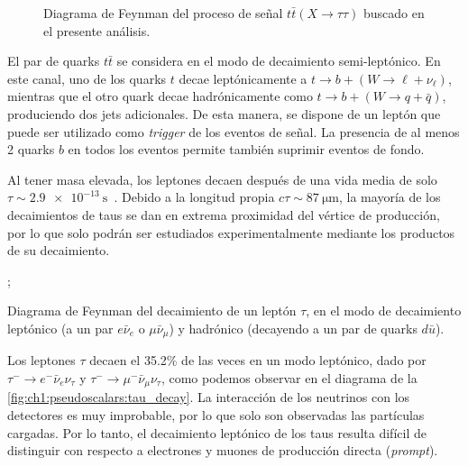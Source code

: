 \begin{figure}[t]
  \centering
  \resizebox{0.7\linewidth}{!}{\ttXdiagram[small]}
  \caption{Diagrama de Feynman del proceso de señal $t\bar{t}(X \to \tau\tau)$ buscado en el presente análisis.}
  \label{fig:ch1:pseudoscalars:ttX:diagram}
\end{figure}

El par de quarks $t\bar{t}$ se considera en el modo de decaimiento semi-leptónico. En este canal, uno de los quarks $t$ decae leptónicamente a $t \to b + (W \to \ell + \nu_\ell)$, mientras que el otro quark decae hadrónicamente como $t \to b + (W \to q + \bar{q})$, produciendo dos jets adicionales. De esta manera, se dispone de un leptón que puede ser utilizado como \textit{trigger} de los eventos de señal. La presencia de al menos 2 quarks $b$ en todos los eventos permite también suprimir eventos de fondo.

Al tener masa elevada, los leptones \ttau decaen después de una vida media de solo $\tau \sim \SI{2.9e-13}{\second}$~\cite{Zyla2020}. Debido a la longitud propia $c\tau \sim \SI{87}{\micro\meter}$, la mayoría de los decaimientos de taus se dan en extrema proximidad del vértice de producción, por lo que solo podrán ser estudiados experimentalmente mediante los productos de su decaimiento.

\begin{marginfigure}
  ;
  \caption{Diagrama de Feynman del decaimiento de un leptón $\tau$, en el modo de decaimiento leptónico (a un par $e\bar{\nu}_e$ o $\mu\bar{\nu}_\mu$) y hadrónico (decayendo a un par de quarks $d\bar{u}$).}
  \label{fig:ch1:pseudoscalars:tau_decay}
\end{marginfigure}

Los leptones $\tau$ decaen el 35.2\% de las veces en un modo leptónico, dado por $\tau^- \to e^- \bar{\nu}_e \nu_\tau$ y $\tau^- \to \mu^- \bar{\nu}_\mu \nu_\tau$, como podemos observar en el diagrama de la \cref{fig:ch1:pseudoscalars:tau_decay}. La interacción de los neutrinos con los detectores es muy improbable, por lo que solo son observadas las partículas cargadas. Por lo tanto, el decaimiento leptónico de los taus resulta difícil de distinguir con respecto a electrones y muones de producción directa (\textit{prompt}).

